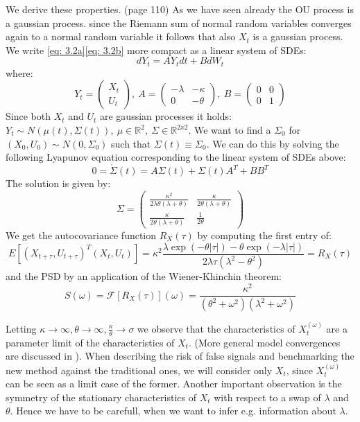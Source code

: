 \documentclass[%
thesis=student,%
coverpage=false,%
titlepage=false,%
headmarks=true, %
german,%
font=libertine, %
math=newpxtx, %
BCOR=5mm,%
coverBCOR=11mm%
]{tumbook}
\begin{document}
We derive these properties. \cite{gardiner:2009}(page 110) As we have seen already the OU process is a gaussian process. since the Riemann sum of normal random variables converges again to a normal random variable it follows that also $X_{t}$ is a gaussian process. We write \eqref{eq: 3.2a}\eqref{eq: 3.2b} more compact as a linear system of SDEs: 
\[
dY_{t} = AY_{t}dt + BdW_{t}
\]
where:
\[
Y_{t} = 
\begin{pmatrix}
   X_{t} \\
   U_{t}
\end{pmatrix}
,\ A = 
\begin{pmatrix}
    -\lambda & -\kappa \\
    0        & -\theta
\end{pmatrix}
,\ B = 
\begin{pmatrix}
    0 & 0 \\
    0 & 1
\end{pmatrix}
\]
Since both $X_{t}$ and $U_{t}$ are gaussian processes it holds: $Y_{t} \sim N(\mu(t),\Sigma(t)),\ \mu \in \mathbb{R}^{2}, \ \Sigma \in \mathbb{R}^{2x2}$. We want to find a $\Sigma_{0}$ for $(X_{0},U_{0}) \sim N(0,\Sigma_{0})$ such that $\Sigma(t) \equiv \Sigma_{0}$. We can do this by solving the following Lyapunov equation corresponding to the linear system of SDEs above: 
\[
0 = \dot{\Sigma}(t) = A\Sigma(t) + \Sigma(t) A^{T} + BB^{T} 
\]
The solution is given by: 
\[
\Sigma = 
\begin{pmatrix}
    \frac{\kappa^{2}}{2\lambda\theta(\lambda + \theta)} & \frac{\kappa}{2\theta(\lambda + \theta)} \\
    \frac{\kappa}{2\theta(\lambda + \theta)} & \frac{1}{2\theta}
\end{pmatrix}
\]
We get the autocovariance function $R_{X}(\tau)$ by computing the first entry of: 
\[
E[(X_{t+\tau},U_{t+\tau})^{T}(X_{t},U_{t})] = \kappa^{2}\frac{\lambda\exp(-\theta\lvert\tau\rvert)-\theta\exp(-\lambda\lvert\tau\rvert)}{2\lambda\tau(\lambda^{2}-\theta^{2})} = R_{X}(\tau)
\]
and the PSD by an application of the Wiener-Khinchin theorem:
\[
S(\omega) = \mathcal{F}[R_{X}(\tau)](\omega) = \frac{\kappa^{2}}{(\theta^{2} + \omega^{2})(\lambda^{2} + \omega^{2})}
\]

Letting $\kappa \rightarrow \infty, \theta \rightarrow \infty, \frac{\kappa}{\theta} \rightarrow \sigma$ we observe that the characteristics of $X_{t}^{(\omega)}$ are a parameter limit of the characteristics of $X_{t}$. (More general model convergences are discussed in \cite{horsthemke:1984}). When describing the risk of false signals and benchmarking the new method against the traditional ones, we will consider only $X_{t}$, since $X_{t}^{(\omega)}$ can be seen as a limit case of the former.
Another important observation is the symmetry of the stationary characteristics of $X_{t}$ with respect to a swap of $\lambda$ and $\theta$. Hence we have to be carefull, when we want to infer e.g. information about $\lambda$.
\end{document}
